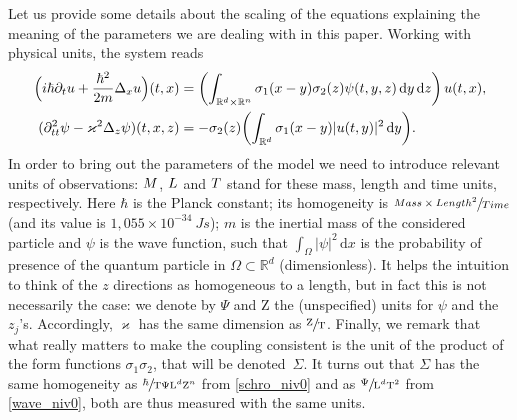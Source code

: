 \documentclass[11pt]{article}
\theoremstyle{definition}
\newcommand{\ud}{\, {\mathrm{d}}}
\begin{document}
Let us provide some details about the scaling of the equations
explaining the meaning of the parameters we are dealing with in this paper. Working with physical units, the system reads
\begin{subequations}
\begin{align}
\label{schro_niv0}
\Bigl(i\hbar \partial_{t}u+\frac{\hbar ^2}{2m}\Delta_{x}u\Bigr)(t,x)&=\left(\int_{\mathbb R^d\times\mathbb R^n}
\sigma_{1}(x-y) \sigma_{2}(z)\psi(t,y,z)\ud y\ud z\right)u(t,x),\\
\label{wave_niv0}(\partial_{tt}^{2}\psi-\varkappa^{2}\Delta_{z}\psi)(t,x,z)&=-\sigma_{2}(z)\biggl(\int_{\mathbb R^d} \sigma_{1}(x-y)|u(t,y)|^{2}
\ud y\biggr).
\end{align}
\end{subequations}
In order to bring out the parameters of the model we need to introduce relevant units of observations: $\textup M$, $\textup L$ and $\textup T$
stand for these mass, length and time units, respectively.
Here $\hbar $ is the Planck constant; its homogeneity is $\sfrac{\textup{Mass}\times \textup{Length}^2}{ \textup{Time}}$ (and its value is $1,055 \times10^{-34}\ J s$); $m$ is the inertial mass of the considered particle and $\psi$ is the wave function, such that $\int_\Omega |\psi|^2\ud x$ is
the probability of presence of the quantum particle in $\Omega\subset \mathbb R^d$ (dimensionless).
It helps the intuition to think of the $z$ directions as homogeneous to a length, but in fact this is not necessarily the case: we denote by $\Psi$ and $\mathrm Z$ the (unspecified) units for $\psi$ and the $z_j$'s. Accordingly, $\varkappa$ has the same dimension as $\sfrac{\mathrm Z}{\mathrm T}$.
Finally, we remark that what really matters to make the coupling consistent is the unit of the product of the form functions $\sigma_1\sigma_2$, that will be denoted~$\Sigma$. It turns out that $\Sigma $ has the same homogeneity
as
$\sfrac{\hbar }{ \mathrm T \Psi\mathrm L^d\mathrm Z^n}$
from \eqref{schro_niv0}
and
as $\sfrac{ \Psi}{\mathrm L^d \mathrm T^2}$
from \eqref{wave_niv0}, both are thus measured with the same units.
\end{document}
